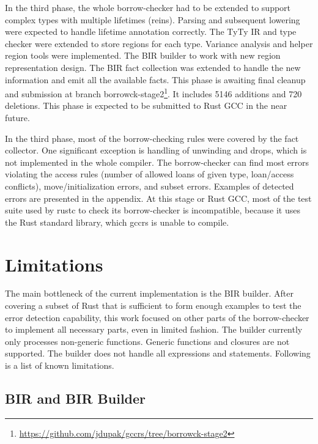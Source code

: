 \documentclass[
  11pt,
  twoside,symmetric]{report}
\DeclareRobustCommand{\href}[2]{#2\footnote{\url{#1}}}
\begin{document}
In the third phase, the whole borrow-checker had to be extended to
support complex types with multiple lifetimes (reins). Parsing and
subsequent lowering were expected to handle lifetime annotation
correctly. The TyTy IR and type checker were extended to store regions
for each type. Variance analysis and helper region tools were
implemented. The BIR builder to work with new region representation
design. The BIR fact collection was extended to handle the new
information and emit all the available facts. This phase is awaiting
final cleanup and submission at branch
\href{https://github.com/jdupak/gccrs/tree/borrowck-stage2}{borrowck-stage2}.
It includes 5146 additions and 720 deletions. This phase is expected to
be submitted to Rust GCC in the near future.

In the third phase, most of the borrow-checking rules were covered by
the fact collector. One significant exception is handling of unwinding
and drops, which is not implemented in the whole compiler. The
borrow-checker can find most errors violating the access rules (number
of allowed loans of given type, loan/access conflicts),
move/initialization errors, and subset errors. Examples of detected
errors are presented in the appendix. At this stage or Rust GCC, most of
the test suite used by rustc to check its borrow-checker is
incompatible, because it uses the Rust standard library, which gccrs is
unable to compile.

\hypertarget{limitations}{%
\section{Limitations}\label{limitations}}

The main bottleneck of the current implementation is the BIR builder.
After covering a subset of Rust that is sufficient to form enough
examples to test the error detection capability, this work focused on
other parts of the borrow-checker to implement all necessary parts, even
in limited fashion. The builder currently only processes non-generic
functions. Generic functions and closures are not supported. The builder
does not handle all expressions and statements. Following is a list of
known limitations.

\hypertarget{bir-and-bir-builder}{%
\subsection{BIR and BIR Builder}\label{bir-and-bir-builder}}
\end{document}
